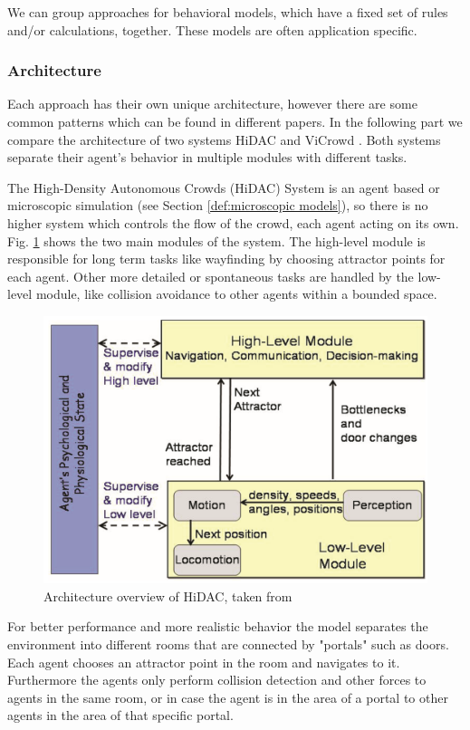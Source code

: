 \documentclass{acmsiggraph}               %
\begin{document}
We can group approaches for behavioral models, which have a fixed set of rules and/or calculations, together. These models are often application specific.

\subsubsection{Architecture}

Each approach has their own unique architecture, however there are some common patterns which can be found in different papers. In the following part we compare the architecture of two systems HiDAC \cite{pelechano_controlling_2007} and ViCrowd \cite{musse_hierarchical_2001}. Both systems separate their agent's behavior in multiple modules with different tasks.

The High-Density Autonomous Crowds (HiDAC) System  is an agent based or microscopic simulation (see Section \ref{def:microscopic models}), so there is no higher system which controls the flow of the crowd, each agent acting on its own.
Fig. \ref{fig:hidacArchitecture} shows the two main modules of the system. The high-level module is responsible for long term tasks like wayfinding by choosing attractor points for each agent. Other more detailed or spontaneous tasks are handled by the low-level module, like collision avoidance to other agents  within a bounded space.
\begin{figure}[h]
  \centering
  \includegraphics[width=1\linewidth]{images/hidac-architacture.png}
  \caption{Architecture overview of HiDAC,  taken from \protect\cite{pelechano_controlling_2007}}
  \label{fig:hidacArchitecture}
\end{figure}
For better performance and more realistic behavior the model separates the environment into different rooms that are connected by "portals" such as doors. Each agent chooses an attractor point in the room and navigates to it. Furthermore the agents only perform collision detection and other forces to agents in the same room, or in case the agent is in the area of a portal to other agents in the area of that specific portal.
\end{document}
